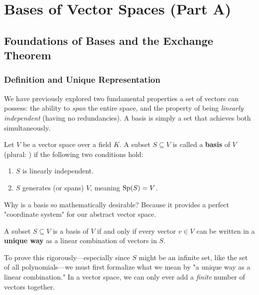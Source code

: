 \setcounter{chapter}{9}
\renewcommand{\thetheorem}{\thechapter.\arabic{section}.\arabic{theorem}}
\setcounter{theorem}{0}

\chapter{Bases of Vector Spaces (Part A)}

\section{Foundations of Bases and the Exchange Theorem}

\subsection{Definition and Unique Representation}

We have previously explored two fundamental properties a set of vectors can possess: the ability to \textit{span} the entire space, and the property of being \textit{linearly independent} (having no redundancies). A basis is simply a set that achieves both simultaneously.

\begin{definition}[Basis]
Let $V$ be a vector space over a field $K$. A subset $S \subseteq V$ is called a \textbf{basis} of $V$ (plural: ) if the following two conditions hold:
\begin{enumerate}
    \item $S$ is linearly independent.
    \item $S$ generates (or spans) $V$, meaning $\operatorname{Sp}(S) = V$.
\end{enumerate}
\end{definition}

Why is a basis so mathematically desirable? Because it provides a perfect "coordinate system" for our abstract vector space.

\begin{proposition}
A subset $S \subseteq V$ is a basis of $V$ if and only if every vector $v \in V$ can be written in a \textbf{unique way} as a linear combination of vectors in $S$.
\end{proposition}

To prove this rigorously—especially since $S$ might be an infinite set, like the set of all polynomials—we must first formalize what we mean by "a unique way as a linear combination." In a vector space, we can only ever add a \textit{finite} number of vectors together. 


